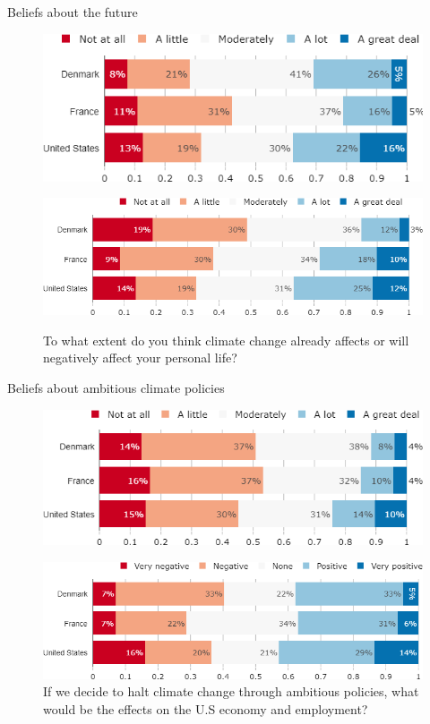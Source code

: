 \documentclass[aspectratio=169,9pt,dvipsnames]{beamer}
\begin{document}
\begin{frame}{Beliefs about the future}%
\begin{figure}[h!]
\caption{To what extent do you think that it is technically feasible to stop greenhouse gas emissions while maintaining satisfactory standards of living in [Country]?}
\includegraphics[width=.6\textwidth]{../figures/country_comparison/net_zero_feasible_countries.png} \\
\caption{To what extent do you think climate change already affects or will negatively affect your personal life?}
\includegraphics[width=.6\textwidth]{../figures/country_comparison/CC_affects_self_countries.png} \\
\end{figure}
\end{frame}

\begin{frame}{Beliefs about ambitious climate policies}%
\begin{figure}[h!]
\centering
\caption{If we decide to halt climate change through ambitious policies, to what extent do you think it would negatively affect your lifestyle?}
\includegraphics[width=.59\textwidth]{../figures/country_comparison/effect_halt_CC_lifestyle_countries.png} \\
\caption{If we decide to halt climate change through ambitious policies, what would be the effects on the U.S economy and employment?}
\includegraphics[width=.59\textwidth]{../figures/country_comparison/effect_halt_CC_economy_countries.png}
\end{figure}
\end{frame}
\end{document}
